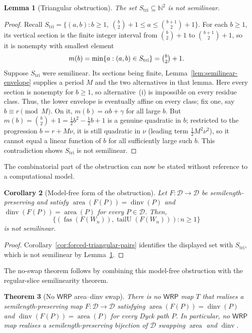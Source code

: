 \documentclass[11pt]{article}
\newtheorem{theorem}{Theorem}[section]
\newtheorem{lemma}[theorem]{Lemma}
\newtheorem{corollary}[theorem]{Corollary}
\theoremstyle{definition}
\newcommand{\D}{\mathcal D}
\newcommand{\N}{\mathbb N}
\newcommand{\WRP}{\mathsf{WRP}}
\newcommand{\area}{\operatorname{area}}
\newcommand{\dinv}{\operatorname{dinv}}
\newcommand{\fas}{\operatorname{fas}}
\newcommand{\tailU}{\operatorname{tailU}}
\begin{document}
\begin{lemma}[Triangular obstruction]
\label{lem:triangular-not-semilinear}
The set $S_{\mathrm{tri}}\subseteq\N^2$ is not semilinear.
\end{lemma}

\begin{proof}
Recall $S_{\mathrm{tri}}=\{(a,b):b\ge 1,\ \binom b2+1\le a\le\binom{b+1}2+1\}$.
For each $b\ge 1$, its vertical section is the finite integer interval from
$\binom b2+1$ to $\binom{b+1}2+1$, so it is nonempty with smallest element
\[
   m(b)=\min\{a:(a,b)\in S_{\mathrm{tri}}\}=\tbinom b2+1.
\]
Suppose $S_{\mathrm{tri}}$ were semilinear.  Its sections being finite,
Lemma~\ref{lem:semilinear-envelope} supplies a period $M$ and the two
alternatives in that lemma.  Here every section is nonempty for $b\ge1$, so
alternative~(i) is impossible on every residue class.  Thus, the lower envelope
is eventually affine on every class; fix one, say $b\equiv r\pmod M$.  On it,
$m(b)=\alpha b+\gamma$ for all large $b$.  But
$m(b)=\binom b2+1=\tfrac12 b^2-\tfrac12 b+1$ is a genuine quadratic in $b$;
restricted to the progression $b=r+M\nu$, it is still quadratic in $\nu$
(leading term $\tfrac12 M^2\nu^2$), so it cannot equal a linear function of
$b$ for all sufficiently large such $b$.  This contradiction shows
$S_{\mathrm{tri}}$ is not semilinear.
\end{proof}

The combinatorial part of the obstruction can now be stated without reference
to a computational model.

\begin{corollary}[Model-free form of the obstruction]
\label{cor:model-free-obstruction}
Let $F\colon\D\to\D$ be semilength-preserving and satisfy
$\area(F(P))=\dinv(P)$ and $\dinv(F(P))=\area(P)$ for every $P\in\D$.  Then,
\[
   \{(\fas(F(W_n)),\tailU(F(W_n))):n\ge1\}
\]
is not semilinear.
\end{corollary}

\begin{proof}
Corollary~\ref{cor:forced-triangular-pairs} identifies the displayed set with
$S_{\mathrm{tri}}$, which is not semilinear by
Lemma~\ref{lem:triangular-not-semilinear}.
\end{proof}

The no-swap theorem follows by combining this model-free obstruction with the
regular-slice semilinearity theorem.

\begin{theorem}[No $\WRP$ area--dinv swap]\label{thm:wrp-no-swap}
There is no $\WRP$ map $T$ that realises a
semilength-preserving map $F\colon\D\to\D$ satisfying
$\area(F(P))=\dinv(P)$ and $\dinv(F(P))=\area(P)$
for every Dyck path $P$.  In particular, no $\WRP$ map realises a
semilength-preserving \emph{bijection} of $\D$ swapping $\area$ and $\dinv$.
\end{theorem}
\end{document}
